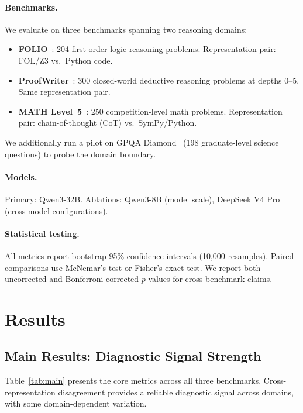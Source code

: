 \documentclass[11pt,a4paper]{article}
\begin{document}
\paragraph{Benchmarks.}
We evaluate on three benchmarks spanning two reasoning domains:
\begin{itemize}
\item \textbf{FOLIO}~\cite{han2022folio}: 204 first-order logic reasoning problems. Representation pair: FOL/Z3 vs.\ Python code.
\item \textbf{ProofWriter}~\cite{tafjord2021proofwriter}: 300 closed-world deductive reasoning problems at depths 0--5. Same representation pair.
\item \textbf{MATH Level~5}~\cite{hendrycks2021math}: 250 competition-level math problems. Representation pair: chain-of-thought (CoT) vs.\ SymPy/Python.
\end{itemize}
We additionally run a pilot on GPQA Diamond~\cite{rein2024gpqa} (198 graduate-level science questions) to probe the domain boundary.

\paragraph{Models.}
Primary: Qwen3-32B. Ablations: Qwen3-8B (model scale), DeepSeek V4 Pro (cross-model configurations).

\paragraph{Statistical testing.}
All metrics report bootstrap 95\% confidence intervals (10,000 resamples). Paired comparisons use McNemar's test or Fisher's exact test. We report both uncorrected and Bonferroni-corrected $p$-values for cross-benchmark claims.

\section{Results}
\label{sec:results}

\subsection{Main Results: Diagnostic Signal Strength}
\label{sec:main-results}

Table~\ref{tab:main} presents the core metrics across all three benchmarks. Cross-representation disagreement provides a reliable diagnostic signal across domains, with some domain-dependent variation.
\end{document}
